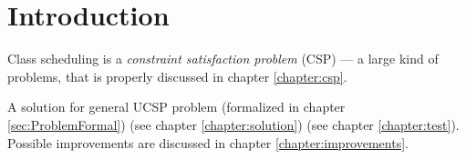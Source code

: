 \documentclass[header]{subfiles}
\begin{document}
\chapter{Introduction}

\todo

\medskip

Class scheduling is a \emph{constraint satisfaction problem} (CSP) ---
a large kind of problems, that is properly discussed in chapter \ref{chapter:csp}.

\medskip

\noindent
A solution for general UCSP problem
(formalized in chapter \ref{sec:ProblemFormal}) 
(see chapter \ref{chapter:solution})  (see chapter \ref{chapter:test}).
Possible improvements are discussed in chapter \ref{chapter:improvements}.
\end{document}
